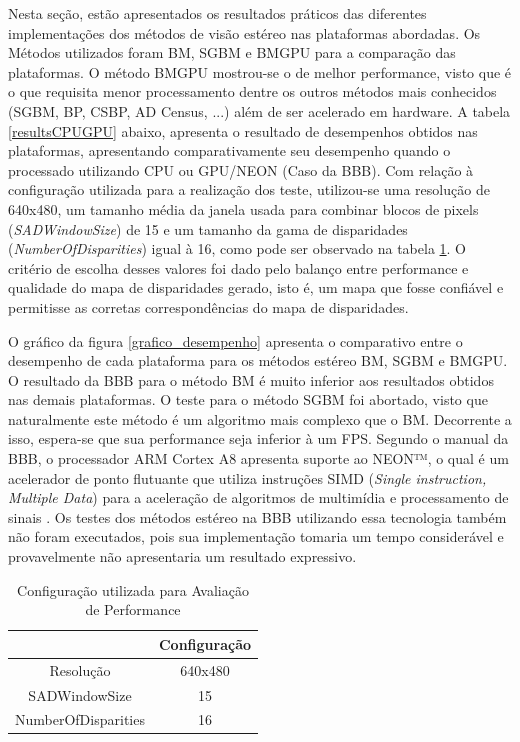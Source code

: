 Nesta seção, estão apresentados os resultados práticos das diferentes implementações dos métodos de visão estéreo nas plataformas abordadas. Os Métodos utilizados foram BM, SGBM e BMGPU para a comparação das plataformas. O método BMGPU mostrou-se o de melhor performance, visto que é o que requisita menor processamento dentre os outros métodos mais conhecidos (SGBM, BP, CSBP, AD Census, ...) além de ser acelerado em hardware. A tabela \ref{resultsCPUGPU} abaixo, apresenta o resultado de desempenhos obtidos nas plataformas, apresentando comparativamente seu desempenho quando o processado utilizando CPU ou GPU/NEON (Caso da BBB). Com relação à configuração utilizada para a realização dos teste, utilizou-se uma resolução de 640x480, um tamanho média da janela usada para combinar blocos de pixels (\textit{SADWindowSize}) de 15 e um tamanho da gama de disparidades (\textit{NumberOfDisparities}) igual à 16, como pode ser observado na tabela \ref{teste_values}. O critério de escolha desses valores foi dado pelo balanço entre performance e qualidade do mapa de disparidades gerado, isto é, um mapa que fosse confiável e permitisse as corretas correspondências do mapa de disparidades.

O gráfico da figura \ref{grafico_desempenho} apresenta o comparativo entre o desempenho de cada plataforma para os métodos estéreo BM, SGBM e BMGPU. O resultado da BBB para o método BM é muito inferior aos resultados obtidos nas demais plataformas. O teste para o método SGBM foi abortado, visto que naturalmente este método é um algoritmo mais complexo que o BM. Decorrente a isso, espera-se que sua performance seja inferior à um FPS. Segundo o manual da BBB, o processador ARM Cortex A8 apresenta suporte ao NEON™, o qual é um acelerador de ponto flutuante que utiliza instruções SIMD (\textit{Single instruction, Multiple Data}) para a aceleração de algoritmos de multimídia e processamento de sinais \cite{ARMNEON}. Os testes dos métodos estéreo na BBB utilizando essa tecnologia também não foram executados, pois sua implementação tomaria um tempo considerável e provavelmente não apresentaria um resultado expressivo. 

\begin{table}[]
\centering
\caption{Configuração utilizada para Avaliação de Performance}
\label{teste_values}
\begin{tabular}{|c|c|}
\hline
                    & Configuração \\ \hline
Resolução           & 640x480      \\ \hline
SADWindowSize       & 15           \\ \hline
NumberOfDisparities & 16           \\ \hline
\end{tabular}
\end{table}

